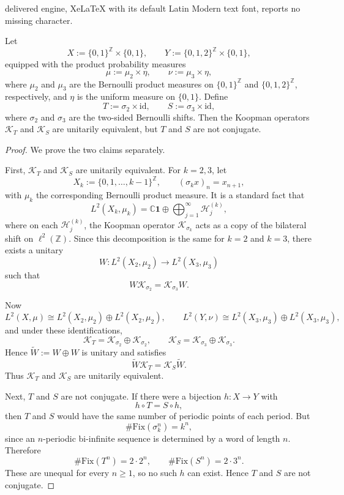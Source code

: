 \documentclass[10pt,a4paper]{amsart}
\begin{document}
delivered engine, XeLaTeX with its default Latin Modern text font, reports no missing character.
\begin{proposition}
\label{prop:bernoulli_counterexample_appendix}
Let
\[
X:=\{0,1\}^{\mathbb Z}\times \{0,1\},
\qquad
Y:=\{0,1,2\}^{\mathbb Z}\times \{0,1\},
\]
equipped with the product probability measures
\[
\mu:=\mu_2\times \eta,
\qquad
\nu:=\mu_3\times \eta,
\]
where \(\mu_2\) and \(\mu_3\) are the Bernoulli product measures on
\(\{0,1\}^{\mathbb Z}\) and \(\{0,1,2\}^{\mathbb Z}\), respectively, and \(\eta\) is the uniform measure on \(\{0,1\}\). Define
\[
T:=\sigma_2\times \mathrm{id},
\qquad
S:=\sigma_3\times \mathrm{id},
\]
where \(\sigma_2\) and \(\sigma_3\) are the two-sided Bernoulli shifts. Then the Koopman operators \(\mathcal K_T\) and \(\mathcal K_S\) are unitarily equivalent, but \(T\) and \(S\) are not conjugate.
\end{proposition}

\begin{proof}
We prove the two claims separately.

First, \(\mathcal K_T\) and \(\mathcal K_S\) are unitarily equivalent. For \(k=2,3\), let
\[
X_k:=\{0,1,\dots,k-1\}^{\mathbb Z},
\qquad
(\sigma_kx)_n=x_{n+1},
\]
with \(\mu_k\) the corresponding Bernoulli product measure. It is a standard fact that
\[
L^2(X_k,\mu_k)
=
\mathbb C \mathbf 1
\oplus
\bigoplus_{j=1}^\infty \mathcal H_j^{(k)},
\]
where on each \(\mathcal H_j^{(k)}\), the Koopman operator \(\mathcal K_{\sigma_k}\) acts as a copy of the bilateral shift on \(\ell^2(\mathbb Z)\). Since this decomposition is the same for \(k=2\) and \(k=3\), there exists a unitary
\[
W:L^2(X_2,\mu_2)\to L^2(X_3,\mu_3)
\]
such that
\[
W\mathcal K_{\sigma_2}=\mathcal K_{\sigma_3}W.
\]

Now
\[
L^2(X,\mu)\cong L^2(X_2,\mu_2)\oplus L^2(X_2,\mu_2),
\qquad
L^2(Y,\nu)\cong L^2(X_3,\mu_3)\oplus L^2(X_3,\mu_3),
\]
and under these identifications,
\[
\mathcal K_T=\mathcal K_{\sigma_2}\oplus \mathcal K_{\sigma_2},
\qquad
\mathcal K_S=\mathcal K_{\sigma_3}\oplus \mathcal K_{\sigma_3}.
\]
Hence \(\widetilde W:=W\oplus W\) is unitary and satisfies
\[
\widetilde W \mathcal K_T = \mathcal K_S \widetilde W.
\]
Thus \(\mathcal K_T\) and \(\mathcal K_S\) are unitarily equivalent.

Next, \(T\) and \(S\) are not conjugate. If there were a bijection \(h:X\to Y\) with
\[
h\circ T=S\circ h,
\]
then \(T\) and \(S\) would have the same number of periodic points of each period. But
\[
\#\mathrm{Fix}(\sigma_k^n)=k^n,
\]
since an \(n\)-periodic bi-infinite sequence is determined by a word of length \(n\). Therefore
\[
\#\mathrm{Fix}(T^n)=2\cdot 2^n,
\qquad
\#\mathrm{Fix}(S^n)=2\cdot 3^n.
\]
These are unequal for every \(n\ge 1\), so no such \(h\) can exist. Hence \(T\) and \(S\) are not conjugate.
\end{proof}
\end{document}
